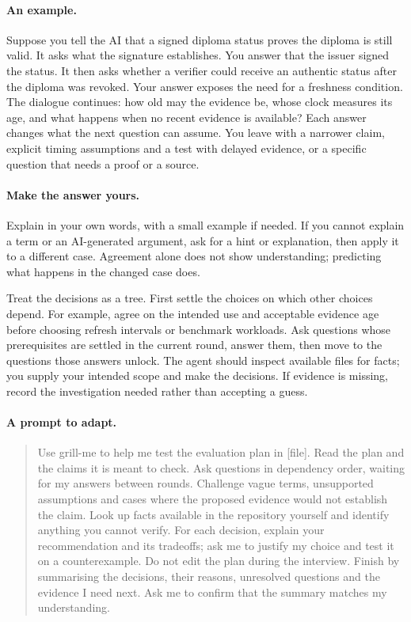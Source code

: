 \paragraph{An example.} Suppose you tell the AI that a signed diploma status proves the diploma is still valid. It asks what the signature establishes. You answer that the issuer signed the status. It then asks whether a verifier could receive an authentic status after the diploma was revoked. Your answer exposes the need for a freshness condition. The dialogue continues: how old may the evidence be, whose clock measures its age, and what happens when no recent evidence is available? Each answer changes what the next question can assume. You leave with a narrower claim, explicit timing assumptions and a test with delayed evidence, or a specific question that needs a proof or a source.

\paragraph{Make the answer yours.} Explain in your own words, with a small example if needed. If you cannot explain a term or an AI-generated argument, ask for a hint or explanation, then apply it to a different case. Agreement alone does not show understanding; predicting what happens in the changed case does.

Treat the decisions as a tree. First settle the choices on which other choices depend. For example, agree on the intended use and acceptable evidence age before choosing refresh intervals or benchmark workloads. Ask questions whose prerequisites are settled in the current round, answer them, then move to the questions those answers unlock. The agent should inspect available files for facts; you supply your intended scope and make the decisions. If evidence is missing, record the investigation needed rather than accepting a guess.

\paragraph{A prompt to adapt.}
\begin{quote}
Use grill-me to help me test the evaluation plan in [file]. Read the plan and the claims it is meant to check. Ask questions in dependency order, waiting for my answers between rounds. Challenge vague terms, unsupported assumptions and cases where the proposed evidence would not establish the claim. Look up facts available in the repository yourself and identify anything you cannot verify. For each decision, explain your recommendation and its tradeoffs; ask me to justify my choice and test it on a counterexample. Do not edit the plan during the interview. Finish by summarising the decisions, their reasons, unresolved questions and the evidence I need next. Ask me to confirm that the summary matches my understanding.
\end{quote}

